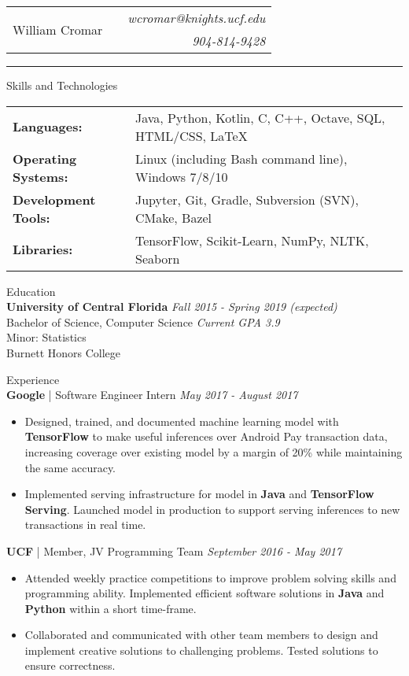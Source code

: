 \documentclass[letterpaper,11pt,oneside]{article}
\newcommand{\mkheader}[3]{
  {\fontfamily{pag}\selectfont
  \begin{tabularx}{\textwidth}{lXr}
    \multirow{2}{*}{\Huge #1} && \emph{#2}
    \\ && \emph{#3}
  \end{tabularx}
  }
  \vspace{2pt}
  \hrule
}
\newcommand{\resheader}[2][]{
  \vspace{9pt}
  {\LARGE #2} #1
  \\
}
\newcommand{\ressubheader}[3][]{
  \vspace{6pt}
  {\large \textbf{#2} #1} \hfill \emph{#3}
  \\
}
\newcommand{\resskill}[1]{\textbf{#1}}
\begin{document}
\mkheader{William Cromar}{wcromar@knights.ucf.edu}{904-814-9428}

\resheader{Skills and Technologies}
\vspace{6pt}
\begin{tabular}{>{\bfseries}l@{\hskip .25cm} l}
  Languages: & Java, Python, Kotlin,  C, C++, Octave, SQL, HTML/CSS, LaTeX \\
  Operating Systems: & Linux (including Bash command line), Windows 7/8/10 \\
  Development Tools: & Jupyter, Git, Gradle, Subversion (SVN), CMake, Bazel \\
  Libraries: & TensorFlow, Scikit-Learn, NumPy, NLTK, Seaborn
\end{tabular}


\resheader{Education}
\ressubheader{University of Central Florida}{Fall 2015 - Spring 2019 (expected)}
Bachelor of Science, Computer Science \hfill \emph{Current GPA 3.9} \\
Minor: Statistics \\
Burnett Honors College

\resheader{Experience}
\ressubheader[| Software Engineer Intern]{Google}{May 2017 - August 2017}
\begin{itemize}
  \item Designed, trained, and documented machine learning model with \resskill{TensorFlow} to make useful inferences over Android Pay transaction data, increasing coverage over existing model by a margin of 20\% while maintaining the same accuracy.
  \item Implemented serving infrastructure for model in \resskill{Java} and \resskill{TensorFlow Serving}. Launched model in production to support serving inferences to new transactions in real time.
\end{itemize}

\ressubheader[| Member, JV Programming Team]{UCF}{September 2016 - May 2017}
\begin{itemize}
  \item Attended weekly practice competitions to improve problem solving skills and programming ability. Implemented efficient software solutions in \resskill{Java} and \resskill{Python} within a short time-frame. 
  \item Collaborated and communicated with other team members to design and implement creative solutions to challenging problems. Tested solutions to ensure correctness.
\end{itemize}
\end{document}
